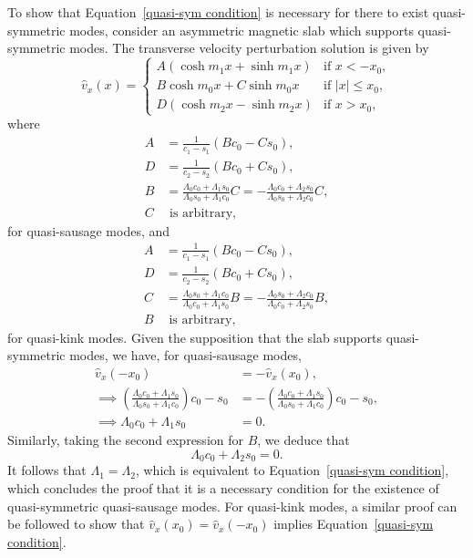 \documentclass[12pt]{../style-files/ociamthesis}
\begin{document}
To show that Equation~\eqref{quasi-sym condition} is necessary for there to exist quasi-symmetric modes, consider an asymmetric magnetic slab which supports quasi-symmetric modes. The transverse velocity perturbation solution is given by
\begin{equation}
\hat{v}_x(x) =
\begin{cases}
A(\cosh{m_1x} + \sinh{m_1x}) & \text{if } x < -x_0, \\
B\cosh{m_0x} + C\sinh{m_0x} & \text{if } |x| \leq x_0, \\
D(\cosh{m_2x} - \sinh{m_2x}) & \text{if } x > x_0, \label{vsoln}
\end{cases}
\end{equation}
where
\begin{align}
A &= \frac{1}{c_1 - s_1}(Bc_0 - Cs_0), \label{constA C} \\ 
D &= \frac{1}{c_2 - s_2}(Bc_0 + Cs_0), \label{constD C} \\
B &= \frac{\Lambda_0c_0 + \Lambda_1s_0}{\Lambda_0s_0 + \Lambda_1c_0}C = -\frac{\Lambda_0c_0 + \Lambda_2s_0}{\Lambda_0s_0 + \Lambda_2c_0}C, \label{constB C} \\
C & \text{ is arbitrary},
\end{align}
for quasi-sausage modes, and
\begin{align}
A &= \frac{1}{c_1 - s_1}(Bc_0 - Cs_0), \label{constA B} \\ 
D &= \frac{1}{c_2 - s_2}(Bc_0 + Cs_0), \label{constD B} \\
C &= \frac{\Lambda_0s_0 + \Lambda_1c_0}{\Lambda_0c_0 + \Lambda_1s_0}B = -\frac{\Lambda_0s_0 + \Lambda_2c_0}{\Lambda_0c_0 + \Lambda_2s_0}B, \label{constB B} \\
B & \text{ is arbitrary},
\end{align}
for quasi-kink modes. Given the supposition that the slab supports quasi-symmetric modes, we have, for quasi-sausage modes,
\begin{align}
\hat{v}_x(-x_0) &= -\hat{v}_x(x_0), \\
\implies \left(\frac{\Lambda_0c_0 + \Lambda_1s_0}{\Lambda_0s_0 + \Lambda_1c_0}\right) c_0 - s_0 &= -\left(\frac{\Lambda_0c_0 + \Lambda_1s_0}{\Lambda_0s_0 + \Lambda_1c_0}\right)c_0 - s_0, \\
\implies \Lambda_0c_0 + \Lambda_1s_0 &= 0.
\end{align}
Similarly, taking the second expression for $B$, we deduce that 
\begin{equation}
\Lambda_0c_0 + \Lambda_2s_0 = 0.
\end{equation}
It follows that $\Lambda_1 = \Lambda_2$, which is equivalent to Equation~\eqref{quasi-sym condition}, which concludes the proof that it is a necessary condition for the existence of quasi-symmetric quasi-sausage modes. For quasi-kink modes, a similar proof can be followed to show that $\hat{v}_x(x_0) = \hat{v}_x(-x_0)$ implies Equation~\eqref{quasi-sym condition}.
\end{document}
